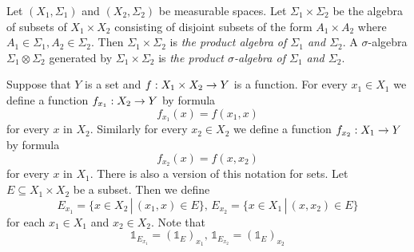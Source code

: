 \begin{definition}
Let $(X_1,\Sigma_1)$ and $(X_2,\Sigma_2)$ be measurable spaces. Let $\Sigma_1\times \Sigma_2$ be the algebra of subsets of $X_1\times X_2$ consisting of disjoint subsets of the form $A_1\times A_2$ where $A_1 \in \Sigma_1,A_2\in \Sigma_2$. Then $\Sigma_1\times \Sigma_2$ is \textit{the product algebra of $\Sigma_1$ and $\Sigma_2$}. A $\sigma$-algebra $\Sigma_1\otimes \Sigma_2$ generated by $\Sigma_1\times \Sigma_2$ is \textit{the product $\sigma$-algebra of $\Sigma_1$ and $\Sigma_2$}.
\end{definition}
\noindent
Suppose that $Y$ is a set and $f:X_1\times X_2\rightarrow Y$ is a function. For every $x_1\in X_1$ we define a function $f_{x_1}:X_2\rightarrow Y$ by formula 
$$f_{x_1}(x) = f(x_1,x)$$
for every $x$ in $X_2$. Similarly for every $x_2\in X_2$ we define a function $f_{x_2}:X_1\rightarrow Y$ by formula
$$f_{x_2}(x) = f(x,x_2)$$
for every $x$ in $X_1$. There is also a version of this notation for sets. Let $E\subseteq X_1\times X_2$ be a subset. Then we define
$$E_{x_1} = \{x\in X_2\,|\,(x_1,x)\in E\},\,E_{x_2} = \{x\in X_1\,|\,(x,x_2)\in E\}$$
for each $x_1\in X_1$ and $x_2\in X_2$. Note that
$$\mathbb{1}_{E_{x_1}} = \left(\mathbb{1}_E\right)_{x_1},\,\mathbb{1}_{E_{x_2}} = \left(\mathbb{1}_E\right)_{x_2}$$


